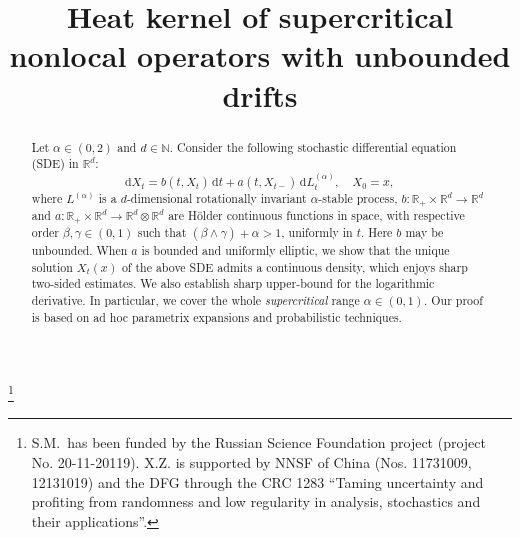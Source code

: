 \documentclass[JEP,XML,SOM,Unicode,published]{cedram}
\theoremstyle{plain}
\theoremstyle{definition}
\newcommand\1{{\mathbf{1}}}
\begin{document}
\frontmatter
\title[Heat kernel of supercritical SDEs with unbounded drifts]{Heat kernel of supercritical nonlocal operators with unbounded drifts}

\author[\initial{S.} \lastname{Menozzi}]{ }
\address{Laboratoire de Modélisation Mathématique d'Evry (LaMME), UMR CNRS 8071, Université d'Evry Val d'Essonne (Université Paris Saclay)\\
23 Boulevard de France 91037 Evry, France\\
\& Laboratory of Stochastic Analysis, HSE\\
Pokrovsky Blvd, 11, Moscow, Russian Federation}

\author[\initial{X.} \lastname{Zhang}]{ }
\address{School of Mathematics and Statistics, Wuhan University\\
Wuhan, Hubei 430072, P.R. China}
\urladdr{}

\thanks{S.M.\ has been funded by the Russian Science Foundation project (project No. 20-11-20119). X.Z.\,\,is supported by NNSF of China (Nos. 11731009, 12131019) and the DFG through the CRC 1283
``Taming uncertainty and profiting from randomness and low regularity in analysis, stochastics and their applications''.}

\begin{abstract}
Let $\alpha\in(0,2)$ and $d\in\mathbb N$. Consider the following stochastic differential equation (SDE) in $\mathbb R^d$:
\[
\mathrm d X_t=b(t,X_t)\,\mathrm{d} t+a(t,X_{t-})\,\mathrm{d} L^{(\alpha)}_t,\quad X_0=x,
\]
where $L^{(\alpha)}$ is a $d$-dimensional rotationally invariant $\alpha$-stable process, $b:\mathbb R_+\times\mathbb R^d\to\mathbb R^d$ and $a:\mathbb R_+\times\mathbb R^d\to\mathbb R^d\otimes\mathbb R^d$ are Hölder continuous functions in space, with respective order $\beta,\gamma\in (0,1)$ such that $(\beta\wedge \gamma)+\alpha>1$, uniformly in $t$. Here $b$ may be unbounded. When $a$ is bounded and uniformly elliptic, we show that the unique solution $X_t(x)$ of the above SDE admits a continuous density, which enjoys sharp two-sided estimates. We also establish sharp upper-bound for the logarithmic derivative. In particular, we cover the whole \emph{supercritical} range $\alpha\in (0,1) $. Our proof is based on ad hoc parametrix expansions and probabilistic techniques.
\end{abstract}
\end{document}
